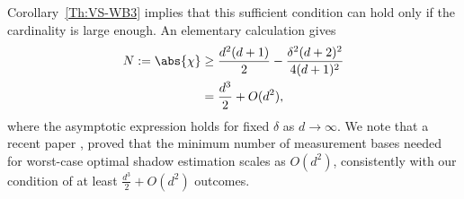 \documentclass[aps,twocolumn,pra,superscriptaddress,nofootinbib]{revtex4-2}
\begin{document}
{Corollary~\ref{Th:VS-WB3} implies that this sufficient condition can hold only if the cardinality is large enough. An elementary calculation gives
\begin{align}
    N:=\abs{\chi}
    &\geq
    \frac{d^{2}(d+1)}{2}
    -
    \frac{\delta^{2}(d+2)^{2}}{4(d+1)^{2}}
    \nonumber\\
    &=
    \frac{d^{3}}{2}+O(d^{2}),
\end{align}
where the asymptotic expression holds for fixed $\delta$ as $d\to\infty$. We note that a recent paper \cite{MinimalMeasurementSettings2026}, proved that the minimum number of measurement bases needed for worst-case optimal shadow estimation scales as $O(d^{2})$, consistently with our condition of at least $ \frac{d^{3}}{2}+O(d^{2})$ outcomes. 
}
\end{document}
